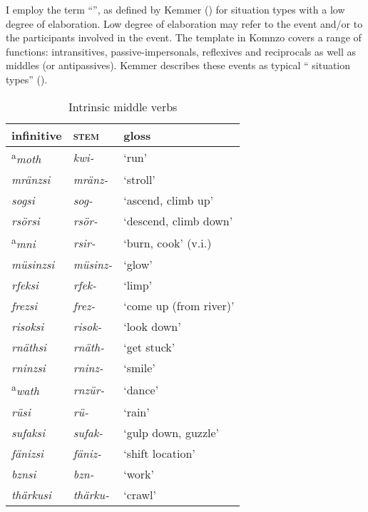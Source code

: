I employ the term ``'', as defined by Kemmer (\citeyear[207-210]{Kemmer:1993wda}) for situation types with a low degree of elaboration. Low degree of elaboration may refer to the event and/or to the participants involved in the event. The  template in Komnzo covers a range of functions: intransitives, passive-impersonals, reflexives and reciprocals as well as  middles (or antipassives). Kemmer describes these events as typical `` situation types'' (\citeyear[15]{Kemmer:1993wda}).

\begin{table}
\caption{Intrinsic middle verbs}
\label{intrinsicmiddleverbs}
	\begin{tabular}{lll}
		\lsptoprule
		{infinitive} & \Ext{} \textsc{stem}		& {gloss}\\  \midrule
		\textsuperscript{a}\emph{moth}		& \emph{kwi-}				& `run'\\
		\emph{mränzsi}		& \emph{mränz-}				& `stroll'\\
		\emph{sogsi}		& \emph{sog-}				& `ascend, climb up'\\
		\emph{rsörsi}		& \emph{rsör-}				& `descend, climb down'\\
		\textsuperscript{a}\emph{mni}		& \emph{rsir-}				& `burn, cook' (v.i.)\\
		\emph{müsinzsi}		& \emph{müsinz-}			& `glow'\\
		\emph{rfeksi}		& \emph{rfek-}				& `limp'\\
		\emph{frezsi}		& \emph{frez-}				& `come up (from river)'\\
		\emph{risoksi}		& \emph{risok-}				& `look down'\\
		\emph{rnäthsi}		& \emph{rnäth-}				& `get stuck'\\
		\emph{rninzsi}		& \emph{rninz-}				& `smile'\\
		\textsuperscript{a}\emph{wath}		& \emph{rnzür-}				& `dance'\\
		\emph{rüsi}			& \emph{rü-}				& `rain'\\
		\emph{sufaksi}		& \emph{sufak-}				& `gulp down, guzzle'\\
		\emph{fänizsi}		& \emph{fäniz-}				& `shift location'\\
		\emph{bznsi}		& \emph{bzn-}				& `work'\\
		\emph{thärkusi}		& \emph{thärku-}			& `crawl'\\

\end{tabular}
\end{table}
